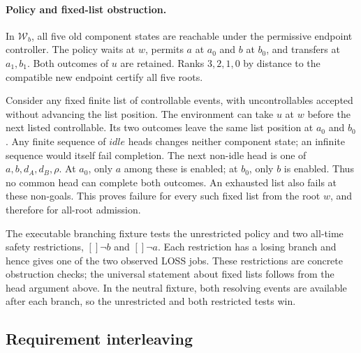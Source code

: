 \documentclass[11pt]{article}
\begin{document}
\paragraph{Policy and fixed-list obstruction.}
In $\mathcal W_b$, all five old component states are reachable under the permissive endpoint controller. The policy waits at $w$, permits $a$ at $a_0$ and $b$ at $b_0$, and transfers at $a_1,b_1$. Both outcomes of $u$ are retained. Ranks $3,2,1,0$ by distance to the compatible new endpoint certify all five roots.

Consider any fixed finite list of controllable events, with uncontrollables accepted without advancing the list position. The environment can take $u$ at $w$ before the next listed controllable. Its two outcomes leave the same list position at $a_0$ and $b_0$. Any finite sequence of $idle$ heads changes neither component state; an infinite sequence would itself fail completion. The next non-idle head is one of $a,b,d_A,d_B,\rho$. At $a_0$, only $a$ among these is enabled; at $b_0$, only $b$ is enabled. Thus no common head can complete both outcomes. An exhausted list also fails at these non-goals. This proves failure for every such fixed list from the root $w$, and therefore for all-root admission.

The executable branching fixture tests the unrestricted policy and two all-time safety restrictions, $[]\neg b$ and $[]\neg a$. Each restriction has a losing branch and hence gives one of the two observed LOSS jobs. These restrictions are concrete obstruction checks; the universal statement about fixed lists follows from the head argument above. In the neutral fixture, both resolving events are available after each branch, so the unrestricted and both restricted tests win.

\subsection{Requirement interleaving}
\end{document}
